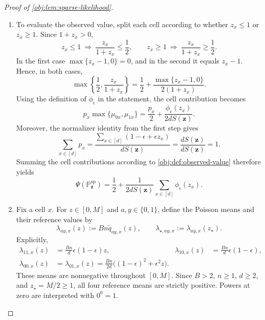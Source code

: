 \begin{proof}[Proof of \cref{obj:lem:sparse-likelihood}]
\begin{enumerate}
\item To evaluate the observed value, split each cell according to whether \(z_x\le1\) or \(z_x\ge1\). Since \(1+z_x>0\),
\[
z_x\le1\ \Longrightarrow\ \frac{z_x}{1+z_x}\le\frac12,
\qquad
z_x\ge1\ \Longrightarrow\ \frac{z_x}{1+z_x}\ge\frac12.
\]
In the first case \(\max\{z_x-1,0\}=0\), and in the second it equals \(z_x-1\). Hence, in both cases,
\[
\max\left\{\frac12,\frac{z_x}{1+z_x}\right\}
=\frac12+\frac{\max\{z_x-1,0\}}{2(1+z_x)}.
\]
Using the definition of \(\phi_\epsilon\) in the statement, the cell contribution becomes
\[
p_x\max\{\mu_{0x},\mu_{1x}\}
=\frac{p_x}{2}
+\frac{\phi_\epsilon(z_x)}{2dS(\mathbf z)}.
\]
Moreover, the normalizer identity from the first step gives
\[
\sum_{x\in[d]}p_x
=\frac{\sum_{x\in[d]}(1-\epsilon+\epsilon z_x)}
{dS(\mathbf z)}
=\frac{dS(\mathbf z)}{dS(\mathbf z)}
=1.
\]
Summing the cell contributions according to \cref{obj:def:observed-value} therefore yields
\[
\Psi(\mathbb P_{\mathbf z}^{\mathrm{sp}})
=\frac12+\frac{1}{2dS(\mathbf z)}
\sum_{x\in[d]}\phi_\epsilon(z_x).
\]

\item Fix a cell \(x\). For \(z\in[0,M]\) and \(a,y\in\{0,1\}\), define the Poisson means and their reference values by
\[
\lambda_{ay,x}(z):=Bn\widetilde q_{ay,x}(z),
\qquad
\lambda_{\star,ay,x}:=\lambda_{ay,x}(z_\star).
\]
Explicitly,
\[
\begin{aligned}
\lambda_{11,x}(z)&=\frac{Bn}{d}\epsilon(1-\epsilon)z,
&
\lambda_{10,x}(z)&=\frac{Bn}{d}\epsilon(1-\epsilon),\\
\lambda_{00,x}(z)&=\lambda_{01,x}(z)
=\frac{Bn}{2d}\bigl((1-\epsilon)^2+\epsilon^2z\bigr).
\end{aligned}
\]
These means are nonnegative throughout \([0,M]\). Since \(B>2\), \(n\ge1\), \(d\ge2\), and \(z_\star=M/2\ge1\), all four reference means are strictly positive. Powers at zero are interpreted with \(0^0=1\).


\end{enumerate}
\end{proof}
